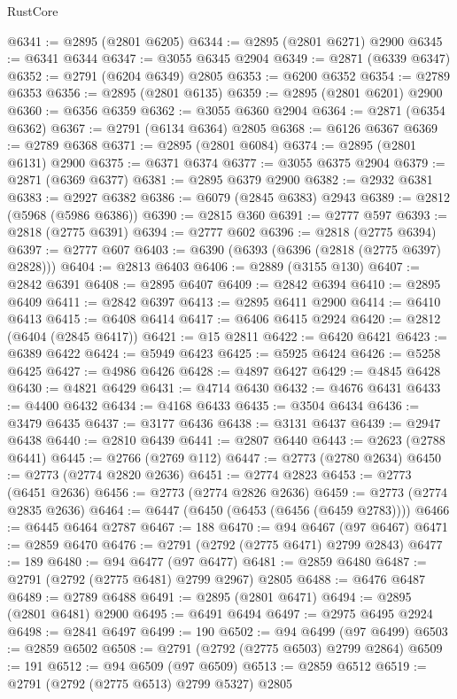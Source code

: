 \begin{lexlean}{RustCore}
\begin{coremodule}
@6341 := @2895 (@2801 @6205)
@6344 := @2895 (@2801 @6271) @2900
@6345 := @6341 @6344
@6347 := @3055 @6345 @2904
@6349 := @2871 (@6339 @6347)
@6352 := @2791 (@6204 @6349) @2805
@6353 := @6200 @6352
@6354 := @2789 @6353
@6356 := @2895 (@2801 @6135)
@6359 := @2895 (@2801 @6201) @2900
@6360 := @6356 @6359
@6362 := @3055 @6360 @2904
@6364 := @2871 (@6354 @6362)
@6367 := @2791 (@6134 @6364) @2805
@6368 := @6126 @6367
@6369 := @2789 @6368
@6371 := @2895 (@2801 @6084)
@6374 := @2895 (@2801 @6131) @2900
@6375 := @6371 @6374
@6377 := @3055 @6375 @2904
@6379 := @2871 (@6369 @6377)
@6381 := @2895 @6379 @2900
@6382 := @2932 @6381
@6383 := @2927 @6382
@6386 := @6079 (@2845 @6383) @2943
@6389 := @2812 (@5968 (@5986 @6386))
@6390 := @2815 @360
@6391 := @2777 @597
@6393 := @2818 (@2775 @6391)
@6394 := @2777 @602
@6396 := @2818 (@2775 @6394)
@6397 := @2777 @607
@6403 := @6390 (@6393 (@6396 (@2818 (@2775 @6397) @2828)))
@6404 := @2813 @6403
@6406 := @2889 (@3155 @130)
@6407 := @2842 @6391
@6408 := @2895 @6407
@6409 := @2842 @6394
@6410 := @2895 @6409
@6411 := @2842 @6397
@6413 := @2895 @6411 @2900
@6414 := @6410 @6413
@6415 := @6408 @6414
@6417 := @6406 @6415 @2924
@6420 := @2812 (@6404 (@2845 @6417))
@6421 := @15 @2811
@6422 := @6420 @6421
@6423 := @6389 @6422
@6424 := @5949 @6423
@6425 := @5925 @6424
@6426 := @5258 @6425
@6427 := @4986 @6426
@6428 := @4897 @6427
@6429 := @4845 @6428
@6430 := @4821 @6429
@6431 := @4714 @6430
@6432 := @4676 @6431
@6433 := @4400 @6432
@6434 := @4168 @6433
@6435 := @3504 @6434
@6436 := @3479 @6435
@6437 := @3177 @6436
@6438 := @3131 @6437
@6439 := @2947 @6438
@6440 := @2810 @6439
@6441 := @2807 @6440
@6443 := @2623 (@2788 @6441)
@6445 := @2766 (@2769 @112)
@6447 := @2773 (@2780 @2634)
@6450 := @2773 (@2774 @2820 @2636)
@6451 := @2774 @2823
@6453 := @2773 (@6451 @2636)
@6456 := @2773 (@2774 @2826 @2636)
@6459 := @2773 (@2774 @2835 @2636)
@6464 := @6447 (@6450 (@6453 (@6456 (@6459 @2783))))
@6466 := @6445 @6464 @2787
@6467 := 188
@6470 := @94 @6467 (@97 @6467)
@6471 := @2859 @6470
@6476 := @2791 (@2792 (@2775 @6471) @2799 @2843)
@6477 := 189
@6480 := @94 @6477 (@97 @6477)
@6481 := @2859 @6480
@6487 := @2791 (@2792 (@2775 @6481) @2799 @2967) @2805
@6488 := @6476 @6487
@6489 := @2789 @6488
@6491 := @2895 (@2801 @6471)
@6494 := @2895 (@2801 @6481) @2900
@6495 := @6491 @6494
@6497 := @2975 @6495 @2924
@6498 := @2841 @6497
@6499 := 190
@6502 := @94 @6499 (@97 @6499)
@6503 := @2859 @6502
@6508 := @2791 (@2792 (@2775 @6503) @2799 @2864)
@6509 := 191
@6512 := @94 @6509 (@97 @6509)
@6513 := @2859 @6512
@6519 := @2791 (@2792 (@2775 @6513) @2799 @5327) @2805

\end{coremodule}
\end{lexlean}
